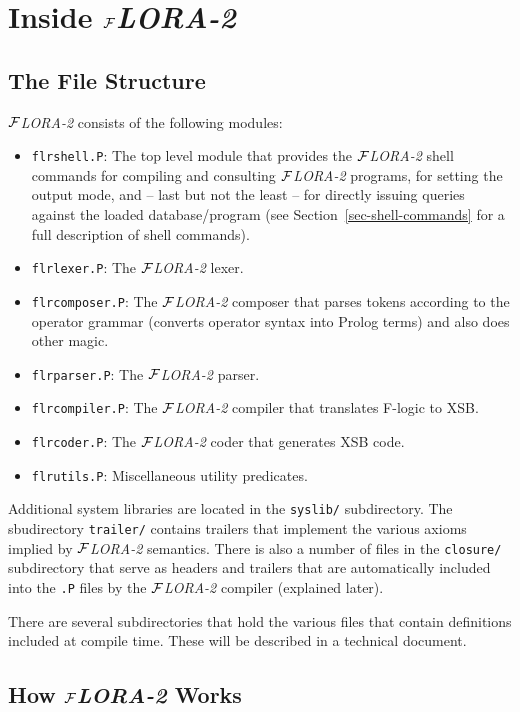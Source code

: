 \documentclass[11pt]{article}
\newcommand{\FLORA}{{\mbox{${\cal F}${\small\it LORA}\rm\emph{-2}}}\xspace}
\newcommand{\fl}{\mbox{F-logic}\xspace}
\begin{document}
\appendix

\section{Inside \FLORA}


\subsection{The File Structure}

\FLORA consists of the following modules:
\begin{itemize}
\item \texttt{flrshell.P}: The top level module that provides the \FLORA shell
  commands for compiling and consulting \FLORA programs, for setting the
  output mode, and -- last but not the least -- for directly issuing
  queries against the loaded database/program (see
  Section~\ref{sec-shell-commands} for a full description of shell
  commands).
\item \texttt{flrlexer.P}: The \FLORA lexer.
\item \texttt{flrcomposer.P}: The \FLORA composer that parses tokens 
  according to the operator grammar (converts operator syntax into Prolog
  terms) and also does other magic.
\item \texttt{flrparser.P}: The \FLORA parser.
\item \texttt{flrcompiler.P}: The \FLORA compiler that translates \fl to XSB.
\item \texttt{flrcoder.P}: The \FLORA coder that generates XSB code.
\item \texttt{flrutils.P}: Miscellaneous utility predicates.
\end{itemize}
Additional system libraries are located in the {\tt syslib/} subdirectory.
The sbudirectory {\tt trailer/} contains trailers that implement the
various axioms implied by \FLORA semantics.  There is also a number of
files in the {\tt closure/} subdirectory that serve as headers and trailers
that are automatically included into the {\tt .P} files by the \FLORA
compiler (explained later).

There are several subdirectories that hold the various files that contain
definitions included at compile time. These will be described in a
technical document.


\subsection{How \FLORA Works}
\end{document}
